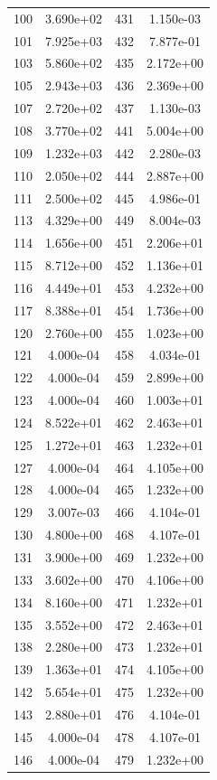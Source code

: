 \documentclass[12pt]{article}
\begin{document}
\begin{longtable}{@{}cccc@{}}
100 & 3.690e+02 & 431 & 1.150e-03 \\
101 & 7.925e+03 & 432 & 7.877e-01 \\
103 & 5.860e+02 & 435 & 2.172e+00 \\
105 & 2.943e+03 & 436 & 2.369e+00 \\
107 & 2.720e+02 & 437 & 1.130e-03 \\
108 & 3.770e+02 & 441 & 5.004e+00 \\
109 & 1.232e+03 & 442 & 2.280e-03 \\
110 & 2.050e+02 & 444 & 2.887e+00 \\
111 & 2.500e+02 & 445 & 4.986e-01 \\
113 & 4.329e+00 & 449 & 8.004e-03 \\
114 & 1.656e+00 & 451 & 2.206e+01 \\
115 & 8.712e+00 & 452 & 1.136e+01 \\
116 & 4.449e+01 & 453 & 4.232e+00 \\
117 & 8.388e+01 & 454 & 1.736e+00 \\
120 & 2.760e+00 & 455 & 1.023e+00 \\
121 & 4.000e-04 & 458 & 4.034e-01 \\
122 & 4.000e-04 & 459 & 2.899e+00 \\
123 & 4.000e-04 & 460 & 1.003e+01 \\
124 & 8.522e+01 & 462 & 2.463e+01 \\
125 & 1.272e+01 & 463 & 1.232e+01 \\
127 & 4.000e-04 & 464 & 4.105e+00 \\
128 & 4.000e-04 & 465 & 1.232e+00 \\
129 & 3.007e-03 & 466 & 4.104e-01 \\
130 & 4.800e+00 & 468 & 4.107e-01 \\
131 & 3.900e+00 & 469 & 1.232e+00 \\
133 & 3.602e+00 & 470 & 4.106e+00 \\
134 & 8.160e+00 & 471 & 1.232e+01 \\
135 & 3.552e+00 & 472 & 2.463e+01 \\
138 & 2.280e+00 & 473 & 1.232e+01 \\
139 & 1.363e+01 & 474 & 4.105e+00 \\
142 & 5.654e+01 & 475 & 1.232e+00 \\
143 & 2.880e+01 & 476 & 4.104e-01 \\
145 & 4.000e-04 & 478 & 4.107e-01 \\
146 & 4.000e-04 & 479 & 1.232e+00 \\

\end{longtable}
\end{document}
